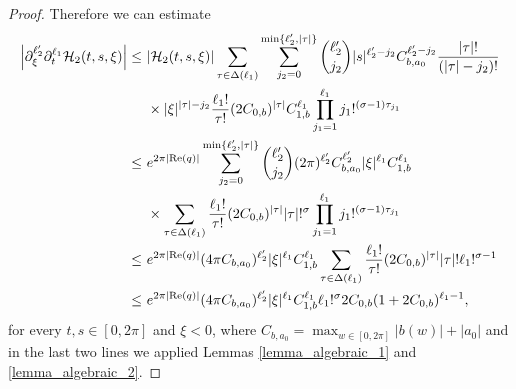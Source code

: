 \documentclass[10pt,a4paper]{amsart}
\newcommand{\Real}{\mathrm{Re}}
\begin{document}
\begin{proof}
Therefore we can estimate
\begin{align}
    \left|\partial_\xi^{\ell_2'}\partial_t^{\ell_1}\mathcal{H}_2(t,s,\xi)\right| \leq &\   |\mathcal{H}_2(t,s,\xi)|\sum_{\tau\in\Delta(\ell_1)}\sum_{j_2=0}^{\min\{\ell_2',|\tau|\}}\binom{\ell_2'}{j_2}|s|^{\ell_2'-j_2}C_{b,a_0}^{\ell_2'-j_2}\frac{|\tau|!}{(|\tau|-j_2)!}\notag\\
    &\  \times |\xi|^{|\tau|-j_2}
    \frac{\ell_1!}{\tau!}(2C_{0,b})^{|\tau|}C_{1,b}^{\ell_1}\prod_{j_1=1}^{\ell_1}j_1!^{(\sigma-1)\tau_{j_1}}\notag\\
    \leq &\  e^{2\pi|\Real(q)|}\sum_{j_2=0}^{\min\{\ell_2',|\tau|\}}\binom{\ell_2'}{j_2}(2\pi)^{\ell_2'}C_{b,a_0}^{\ell_2'}|\xi|^{\ell_1}C_{1,b}^{\ell_1}\notag\\
    &\ \times\sum_{\tau\in\Delta(\ell_1)} 
    \frac{\ell_1!}{\tau!}(2C_{0,b})^{|\tau|}|\tau|!^\sigma\prod_{j_1=1}^{\ell_1}j_1!^{(\sigma-1)\tau_{j_1}}\notag\\
        \leq &\ e^{2\pi|\Real(q)|}(4\pi C_{b,a_0})^{\ell_2'}|\xi|^{\ell_1}C_{1,b}^{\ell_1}\sum_{\tau\in\Delta(\ell_1)} 
    \frac{\ell_1!}{\tau!}(2C_{0,b})^{|\tau|}|\tau|!\ell_1!^{\sigma-1}\notag\\
    \leq &\ e^{2\pi|\Real(q)|}(4\pi C_{b,a_0})^{\ell_2'}|\xi|^{\ell_1}C_{1,b}^{\ell_1}\ell_1!^\sigma 2C_{0,b}(1+2C_{0,b})^{\ell_1-1},\label{H2}
\end{align}
for every $t,s\in[0,2\pi]$ and $\xi<0$, where $C_{b,a_0} = \displaystyle\max_{w\in[0,2\pi]} |b(w)| + |a_0|$ and in the last two lines we applied Lemmas \ref{lemma_algebraic_1} and \ref{lemma_algebraic_2}.


\end{proof}
\end{document}
